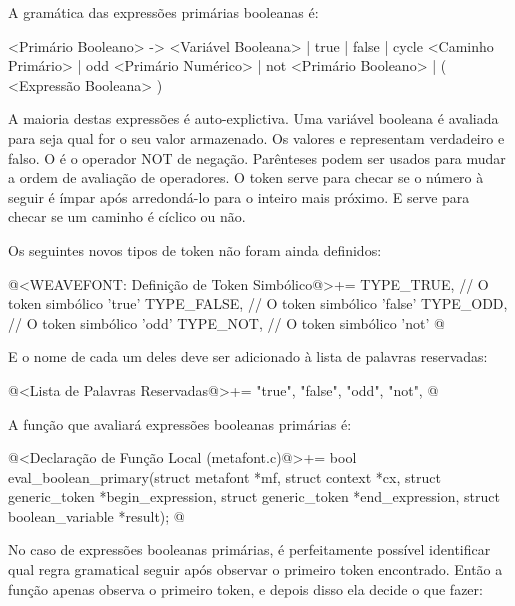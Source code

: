 {{{{{{A gramática das expressões primárias booleanas é:

\alinhaverbatim
<Primário Booleano> -> <Variável Booleana> | true | false |
                       cycle <Caminho Primário> | odd <Primário Numérico> |
                       not <Primário Booleano> |
                       ( <Expressão Booleana> )
\alinhanormal

A maioria destas expressões é auto-explictiva. Uma variável booleana é
avaliada para seja qual for o seu valor armazenado. Os
valores  e  representam verdadeiro
e falso. O  é o operador NOT de negação. Parênteses
podem ser usados para mudar a ordem de avaliação de operadores. O
token  serve para checar se o número à seguir é ímpar
após arredondá-lo para o inteiro mais próximo. E 
serve para checar se um caminho é cíclico ou não.

Os seguintes novos tipos de token não foram ainda definidos:

\iniciocodigo
@<WEAVEFONT: Definição de Token Simbólico@>+=
TYPE_TRUE,                    // O token simbólico 'true'
TYPE_FALSE,                   // O token simbólico 'false'
TYPE_ODD,                     // O token simbólico 'odd'
TYPE_NOT,                     // O token simbólico 'not'
@
\fimcodigo

E o nome de cada um deles deve ser adicionado à lista de palavras
reservadas:

\iniciocodigo
@<Lista de Palavras Reservadas@>+=
"true", "false", "odd", "not",
@
\fimcodigo

A função que avaliará expressões booleanas primárias é:

\iniciocodigo
@<Declaração de Função Local (metafont.c)@>+=
bool eval_boolean_primary(struct metafont *mf, struct context *cx,
                          struct generic_token *begin_expression,
                          struct generic_token *end_expression,
                          struct boolean_variable *result);
@
\fimcodigo

No caso de expressões booleanas primárias, é perfeitamente possível
identificar qual regra gramatical seguir após observar o primeiro
token encontrado. Então a função apenas observa o primeiro token, e
depois disso ela decide o que fazer:

}}}}}}
